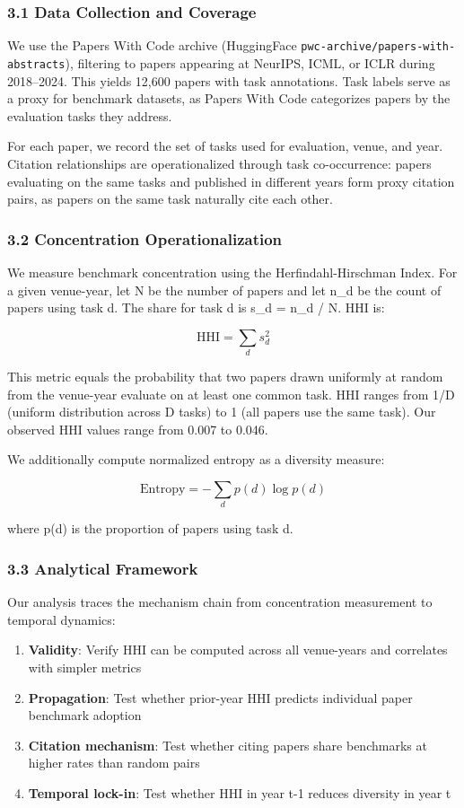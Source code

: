 
\subsubsection{3.1 Data Collection and Coverage}

We use the Papers With Code archive (HuggingFace \texttt{pwc-archive/papers-with-abstracts}), filtering to papers appearing at NeurIPS, ICML, or ICLR during 2018--2024. This yields 12,600 papers with task annotations. Task labels serve as a proxy for benchmark datasets, as Papers With Code categorizes papers by the evaluation tasks they address.

For each paper, we record the set of tasks used for evaluation, venue, and year. Citation relationships are operationalized through task co-occurrence: papers evaluating on the same tasks and published in different years form proxy citation pairs, as papers on the same task naturally cite each other.

\subsubsection{3.2 Concentration Operationalization}

We measure benchmark concentration using the Herfindahl-Hirschman Index. For a given venue-year, let N be the number of papers and let n\_d be the count of papers using task d. The share for task d is s\_d = n\_d / N. HHI is:

$$\text{HHI} = \sum_d s_d^2$$

This metric equals the probability that two papers drawn uniformly at random from the venue-year evaluate on at least one common task. HHI ranges from 1/D (uniform distribution across D tasks) to 1 (all papers use the same task). Our observed HHI values range from 0.007 to 0.046.

We additionally compute normalized entropy as a diversity measure:

$$\text{Entropy} = -\sum_d p(d) \log p(d)$$

where p(d) is the proportion of papers using task d.

\subsubsection{3.3 Analytical Framework}

Our analysis traces the mechanism chain from concentration measurement to temporal dynamics:

\begin{enumerate}
\item \textbf{Validity}: Verify HHI can be computed across all venue-years and correlates with simpler metrics
\item \textbf{Propagation}: Test whether prior-year HHI predicts individual paper benchmark adoption
\item \textbf{Citation mechanism}: Test whether citing papers share benchmarks at higher rates than random pairs
\item \textbf{Temporal lock-in}: Test whether HHI in year t-1 reduces diversity in year t
\end{enumerate}

